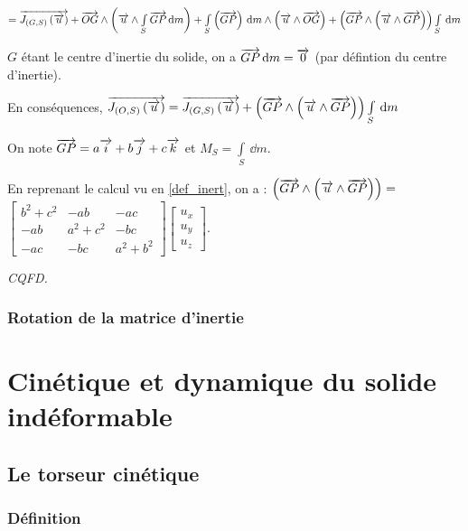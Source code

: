 \documentclass[10pt,fleqn]{article} %
\begin{document}
$= \overrightarrow{J_{\left(G,S\right)}\left(\overrightarrow{u}\right)} 
+ \overrightarrow{OG} \wedge \left(\overrightarrow{u}\wedge \int\limits_{S}\overrightarrow{GP} \,\text{d} m\right) 
+\int\limits_{S} \left( \overrightarrow{GP}\right) \,\text{d} m\wedge \left(\overrightarrow{u}\wedge\overrightarrow{OG}\right)
+ \left(\overrightarrow{GP}\wedge \left(\overrightarrow{u}\wedge \overrightarrow{GP} \right) \right) \int\limits_{S}\,\text{d} m
$ 

$G$ étant le centre d'inertie du solide, on a $\overrightarrow{GP} \,\text{d} m=\overrightarrow{0}$ (par défintion du centre d'inertie). 

En conséquences, $ \overrightarrow{J_{\left(O,S\right)}\left(\overrightarrow{u}\right)} = \overrightarrow{J_{\left(G,S\right)}\left(\overrightarrow{u}\right)} 
+ \left(\overrightarrow{GP}\wedge \left(\overrightarrow{u}\wedge \overrightarrow{GP} \right) \right) \int\limits_{S}\,\text{d} m
$ 

On note $\overrightarrow{GP}=a\overrightarrow{i}+b\overrightarrow{j}+c\overrightarrow{k}$ et $M_S=\int\limits_{S}\,\dd m$.

En reprenant le calcul vu en \ref{def_inert}, on a : 
$\left(\overrightarrow{GP}\wedge \left(\overrightarrow{u}\wedge \overrightarrow{GP} \right) \right) = $
$\begin{bmatrix}
 b^2 +  c^2 &  - ab &      -ac   \\
 -ab  & a^2   +c^2   & - bc   \\
  -ac &    -bc  &   a^2 +b^2 
\end{bmatrix}
\begin{bmatrix}
u_x \\ u_y \\ u_z
\end{bmatrix}$. 

\begin{flushright}
\textit{CQFD.}
\end{flushright}


\subsubsection{Rotation de la matrice d'inertie}

\section{Cinétique et dynamique du solide indéformable}
\subsection{Le torseur cinétique}
\subsubsection{Définition}
\end{document}
